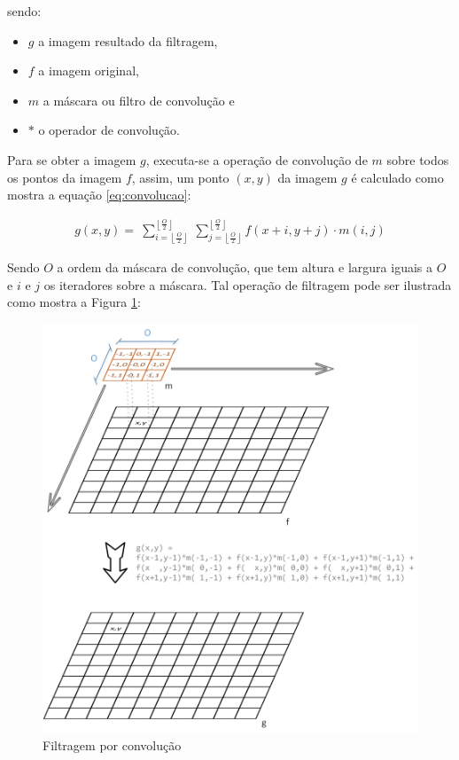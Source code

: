 sendo:

\begin{itemize}
\item \(g\) a imagem resultado da filtragem, 
\item \(f\) a imagem original, 
\item \(m\) a máscara ou filtro de convolução e 
\item \(*\) o operador de convolução.
\end{itemize}

Para se obter a imagem \(g\), executa-se a operação de convolução de \(m\) sobre todos os pontos da imagem \(f\), assim, um ponto \((x,y)\) da imagem \(g\) é calculado como mostra a equação \ref{eq:convolucao}:
	
\begin{equation}
\label{eq:convolucao}
\begin{split}
g(x,y) = \
\sum_{i=\left\lfloor\frac{O}{2}\right\rfloor}^{\left\lfloor\frac{O}{2}\right\rfloor} \
\sum_{j=\left\lfloor\frac{O}{2}\right\rfloor}^{\left\lfloor\frac{O}{2}\right\rfloor}  f(x+i, y+j) \cdot m(i,j)
\end{split}
\end{equation}

Sendo \(O\) a ordem da máscara de convolução, que tem altura e largura iguais a \(O\) e \(i\) e \(j\) os iteradores sobre a máscara. Tal operação de filtragem pode ser ilustrada como mostra a Figura \ref{fig:Convolution}:

\begin{figure}[h]
	\centering	
	\includegraphics[scale=0.55]{Figuras/Convolutio.png}
	\caption{Filtragem por convolução}
	\label{fig:Convolution}
\end{figure}

